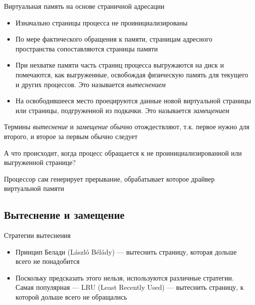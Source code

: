 \documentclass[xetex,aspectratio=43]{beamer}
\begin{document}
\begin{frame}{Виртуальная память на основе страничной адресации}
    \begin{itemize}
        \tightlist
        \item
        Изначально страницы процесса не проинициализированы
        \item
        По мере фактического обращения к памяти, страницам адресного
        пространства сопоставляются страницы памяти
        \item
        При нехватке памяти часть страниц процесса выгружаются на диск и
        помечаются, как выгруженные, освобождая физическую память для текущего
        и других процессов. Это называется \emph{вытеснением}
        \item На освободившееся место проецируются данные новой виртуальной страницы или
        страницы, подгруженной из подкачки.  Это называется \emph{замещением}
    \end{itemize}

    Термины \emph{вытеснение} и \emph{замещение} обычно отождествляют, т.к. первое нужно для второго, и второе за первым обычно следует

    \pause

    А что происходит, когда процесс обращается к не проинициализированной
    или выгруженной странице?

    \pause

    Процессор сам генерирует прерывание, обрабатывает которое драйвер
    виртуальной памяти
\end{frame}


\subsection{Вытеснение и замещение}

\begin{frame}{Стратегии вытеснения}
    \begin{itemize}
        \item
        Принцип Белади (L\'aszl\'o B\'el\'ady) --- вытеснить страницу, которая дольше
        всего не понадобится

        \pause

        \item
        Поскольку предсказать этого нельзя, используются различные стратегии.
        Самая популярная --- LRU (Least Recently Used) --- вытеснить страницу,
        к которой дольше всего не обращались
    \end{itemize}
\end{frame}
\end{document}
